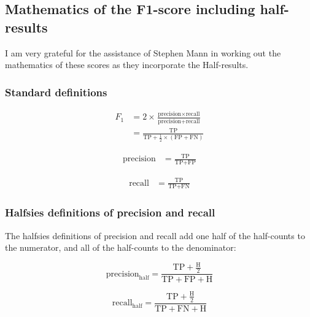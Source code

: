 \documentclass[a4paper,10pt]{article} %
\begin{document}
\subsection{Mathematics of the F1-score including half-results}
\label{math_supp}

I am very grateful for the assistance of Stephen Mann in working out the mathematics of these scores as they incorporate the Half-results.

\subsubsection{Standard definitions}\label{sec:standard}

\begin{align*}
    F_1 &= 2\times\frac{\text{precision}\times\text{recall}}
            {\text{precision} + \text{recall}}\\
        &= \frac{\text{TP}}
            {\text{TP}+\frac{1}{2}\times(\text{FP}+\text{FN})}
\end{align*}

\begin{align*}
    \text{precision} 
        &= \frac{\text{TP}}
            {\text{TP}+\text{FP}}
\end{align*}

\begin{align*}
    \text{recall} 
        &= \frac{\text{TP}}
            {\text{TP}+\text{FN}}
\end{align*}

\subsubsection{Halfsies definitions of precision and recall}\label{sec:halfsies}

The halfsies definitions of precision and recall add one half of the half-counts to the numerator, and all of the half-counts to the denominator:

\begin{equation*}
    \text{precision}_{\text{half}} 
        = \frac{\text{TP}+\frac{\text{H}}{2}}
            {\text{TP}+\text{FP}+\text{H}}
\end{equation*}

\begin{equation*}
    \text{recall}_{\text{half}}
        = \frac{\text{TP}+\frac{\text{H}}{2}}
            {\text{TP}+\text{FN}+\text{H}}
\end{equation*}
\end{document}
